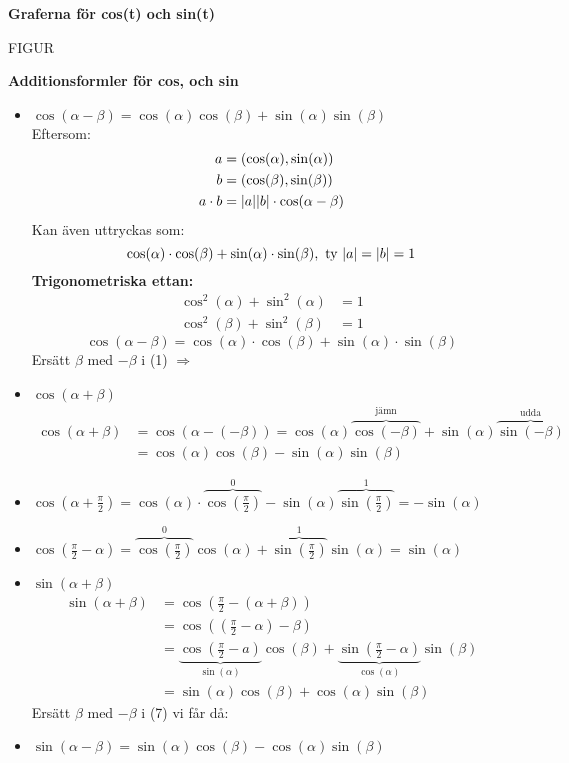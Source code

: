 \textbf{Graferna för cos(t) och sin(t)}
\begin{center}
	FIGUR
\end{center}
\textbf{Additionsformler för cos, och sin}
\begin{itemize}
	\item $\cos(\alpha - \beta) = \cos(\alpha)\cos(\beta) + \sin(\alpha)\sin(\beta)$ \\
	Eftersom:
	\begin{align*}
		a &= (\cos(\alpha), \sin(\alpha))\\
		b &= (\cos(\beta), \sin(\beta))\\
		a \cdot b &= \lvert a\rvert\lvert b\rvert \cdot \cos(\alpha - \beta)
	\end{align*}
	Kan även uttryckas som:
	\[
	\cos(\alpha) \cdot \cos(\beta) + \sin(\alpha) \cdot \sin(\beta), \mbox{ ty } \lvert a\rvert = \lvert b\rvert = 1
	\]
	\textbf{Trigonometriska ettan:}
	\begin{align*}
		\cos^2(\alpha) + \sin^2(\alpha) &= 1\\
		\cos^2(\beta) + \sin^2(\beta) &= 1 
	\end{align*}
	\begin{equation}
	    \cos(\alpha - \beta) = \cos(\alpha) \cdot \cos(\beta) + \sin(\alpha) \cdot \sin(\beta)
	\end{equation}
	Ersätt $\beta$ med $-\beta$ i (1) $\Rightarrow$
	\item $\cos(\alpha + \beta)$
	\begin{align}
		\cos(\alpha + \beta) &= \cos(\alpha - (-\beta)) = \cos(\alpha)\overbrace{\cos(-\beta)}^\text{jämn} + \sin(\alpha)\overbrace{\sin(-\beta)}^\text{udda} \\
		&= \cos(\alpha)\cos(\beta) - \sin(\alpha)\sin(\beta)
	\end{align}
	\item $\cos(\alpha + \frac{\pi}{2}) = \cos(\alpha) \cdot \overbrace{\cos(\frac{\pi}{2})}^{0} - \sin(\alpha)\overbrace{\sin(\frac{\pi}{2})}^{1} = -\sin(\alpha)$
	\item $\cos(\frac{\pi}{2} - \alpha) = \overbrace{\cos(\frac{\pi}{2})}^{0}\cos(\alpha) + \overbrace{\sin(\frac{\pi}{2})}^{1}\sin(\alpha) = \sin(\alpha)$
	\item $\sin(\alpha + \beta)$
	\begin{align}
		\sin(\alpha + \beta) &= \cos(\frac{\pi}{2} - (\alpha + \beta))\\
		&= \cos((\frac{\pi}{2} - \alpha)- \beta) \\
		&= \underbrace{\cos(\frac{\pi}{2} - a)}_{\sin(\alpha)}\cos(\beta) + \underbrace{\sin(\frac{\pi}{2} - \alpha)}_{\cos(\alpha)}\sin(\beta) \\
		&= \sin(\alpha)\cos(\beta) + \cos(\alpha)\sin(\beta)
	\end{align}
	Ersätt $\beta$ med $-\beta$ i (7) vi får då:
	\item $\sin(\alpha - \beta) = \sin(\alpha)\cos(\beta) - \cos(\alpha)\sin(\beta)$
\end{itemize}
